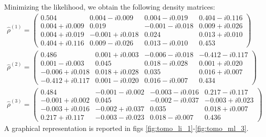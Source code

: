 \documentclass[a4paper, 11pt]{article}
\begin{document}
      Minimizing the likelihood, we obtain the following density matrices:
      \begin{gather*}
        \hat{\rho}^{(1)} =
        \begin{pmatrix}
          0.504  & 0.004 -i0.009 & 0.004 -i0.019 & 0.404 -i0.116 \\
          0.004 +i0.009 & 0.019  & -0.001 -i0.018 & 0.009 +i0.026 \\
          0.004 +i0.019 & -0.001 +i0.018 & 0.024  & 0.013 +i0.010 \\
          0.404 +i0.116 & 0.009 -i0.026 & 0.013 -i0.010 & 0.453
        \end{pmatrix}
        \\
        \hat{\rho}^{(2)} =
        \begin{pmatrix}
          0.486  & 0.001 +i0.003 & -0.006 -i0.018 & -0.412 -i0.117 \\
          0.001 -i0.003 & 0.045  & 0.018 -i0.028 & 0.001 +i0.020 \\
          -0.006 +i0.018 & 0.018 +i0.028 & 0.035  & 0.016 +i0.007 \\
          -0.412 +i0.117 & 0.001 -i0.020 & 0.016 -i0.007 & 0.434
        \end{pmatrix}
        \\
        \hat{\rho}^{(3)} =
        \begin{pmatrix}
          0.484  & -0.001 -i0.002 & -0.003 -i0.016 & 0.217 -i0.117 \\
          -0.001 +i0.002 & 0.045  & -0.002 -i0.037 & -0.003 +i0.023 \\
          -0.003 +i0.016 & -0.002 +i0.037 & 0.035  & 0.018 +i0.007 \\
          0.217 +i0.117 & -0.003 -i0.023 & 0.018 -i0.007 & 0.436
        \end{pmatrix}
      \end{gather*}
      A graphical representation is reported in figs \ref{fig:tomo_li_1}-\ref{fig:tomo_ml_3}.
\end{document}
